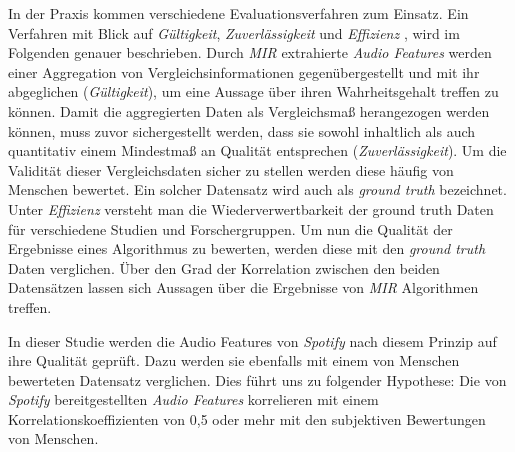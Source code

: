 In der Praxis kommen verschiedene Evaluationsverfahren zum Einsatz.
Ein Verfahren mit Blick auf \textit{Gültigkeit}, \textit{Zuverlässigkeit} und \textit{Effizienz} \cite{Urbano_2013}, wird im Folgenden genauer beschrieben.
Durch \textit{MIR} extrahierte \textit{Audio Features} werden einer Aggregation von Vergleichsinformationen gegenübergestellt und mit ihr abgeglichen (\textit{Gültigkeit}), um eine Aussage über ihren Wahrheitsgehalt treffen zu können.
Damit die aggregierten Daten als Vergleichsmaß herangezogen werden können, muss zuvor sichergestellt werden, dass sie sowohl inhaltlich als auch quantitativ einem Mindestmaß an Qualität entsprechen (\textit{Zuverlässigkeit}).
Um die Validität dieser Vergleichsdaten sicher zu stellen werden diese häufig von Menschen bewertet.
Ein solcher Datensatz wird auch als \textit{ground truth} bezeichnet.
Unter \textit{Effizienz} versteht man die Wiederverwertbarkeit der ground truth Daten für verschiedene Studien und Forschergruppen.
Um nun die Qualität der Ergebnisse eines Algorithmus zu bewerten, werden diese mit den \textit{ground truth} Daten verglichen.
Über den Grad der Korrelation zwischen den beiden Datensätzen lassen sich Aussagen über die Ergebnisse von \textit{MIR} Algorithmen treffen.

In dieser Studie werden die Audio Features von \textit{Spotify} nach diesem Prinzip auf ihre Qualität geprüft.
Dazu werden sie ebenfalls mit einem von Menschen bewerteten Datensatz verglichen.
Dies führt uns zu folgender Hypothese:
Die von \textit{Spotify} bereitgestellten \textit{Audio Features} korrelieren mit einem Korrelationskoeffizienten von 0,5 oder mehr mit den subjektiven Bewertungen von Menschen.
